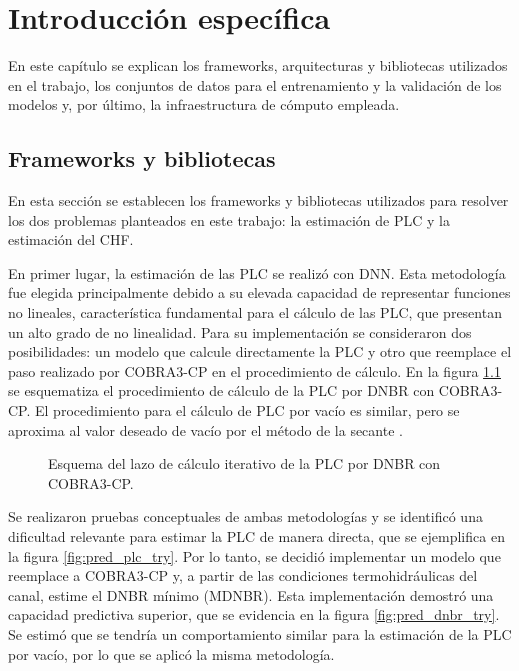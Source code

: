 \chapter{Introducción específica} %
\label{Chapter2}

En este capítulo se explican los frameworks, arquitecturas y bibliotecas utilizados en el trabajo, los conjuntos de datos para el entrenamiento y la validación de los modelos y, por último, la infraestructura de cómputo empleada.

\section{Frameworks y bibliotecas}
\label{sec:frameworks}
En esta sección se establecen los frameworks y bibliotecas utilizados para resolver los dos problemas planteados en este trabajo: la estimación de PLC y la estimación del CHF.

En primer lugar, la estimación de las PLC se realizó con DNN. Esta metodología fue elegida principalmente debido a su elevada capacidad de representar funciones no lineales, característica fundamental para el cálculo de las PLC, que presentan un alto grado de no linealidad. Para su implementación se consideraron dos posibilidades: un modelo que calcule directamente la PLC y otro que reemplace el paso realizado por COBRA3-CP en el procedimiento de cálculo. En la figura \ref{fig:loop_potencia_dnbr} se esquematiza el procedimiento de cálculo de la PLC por DNBR con COBRA3-CP. El procedimiento para el cálculo de PLC por vacío es similar, pero se aproxima al valor deseado de vacío por el método de la secante \citep{burden2015numerical}.

\begin{figure}[htbp]
	\centering
	\resizebox{0.7\textwidth}{!}{
		
	}
	\caption{Esquema del lazo de cálculo iterativo de la PLC por DNBR con COBRA3-CP.}
	\label{fig:loop_potencia_dnbr}
\end{figure}

Se realizaron pruebas conceptuales de ambas metodologías y se identificó una dificultad relevante para estimar la PLC de manera directa, que se ejemplifica en la figura \ref{fig:pred_plc_try}. Por lo tanto, se decidió implementar un modelo que reemplace a COBRA3-CP y, a partir de las condiciones termohidráulicas del canal, estime el DNBR mínimo (MDNBR). Esta implementación demostró una capacidad predictiva superior, que se evidencia en la figura \ref{fig:pred_dnbr_try}. Se estimó que se tendría un comportamiento similar para la estimación de la PLC por vacío, por lo que se aplicó la misma metodología.

